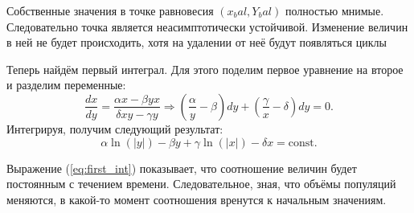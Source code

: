 Собственные значения в точке равновесия $(x_bal, Y_bal)$ полностью мнимые. 
Следовательно точка является неасимптотически устойчивой. Изменение величин в ней не будет происходить, хотя на удалении от неё будут появляться циклы

Теперь найдём первый интеграл. Для этого поделим первое уравнение на второе и разделим переменные:
\begin{equation}
	\frac{dx}{dy} = \frac{\alpha x - \beta yx}{\delta xy - \gamma y} 
	\Rightarrow
	\left(\frac{\alpha}{y} - \beta\right) dy + \left(\frac{\gamma}{x} - \delta\right)dy = 0.
	\label{eq:diff_FI}
\end{equation}
Интегрируя, получим следующий результат:
\begin{equation}
	\alpha \ln(|y|) - \beta y + \gamma \ln(|x|) - \delta x = \text{const}.
	\label{eq:first_int}
\end{equation}

Выражение (\ref{eq:first_int}) показывает, что соотношение величин будет постоянным с течением времени. Следовательное, зная, что объёмы популяций меняются, в какой-то момент соотношения вренутся к начальным значениям.

